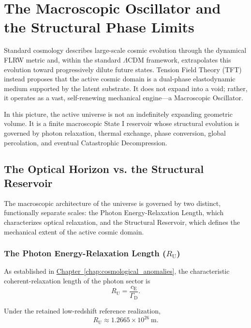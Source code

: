 \chapter{The Macroscopic Oscillator and the Structural Phase Limits}
\label{ch:macroscopic_oscillator}

Standard cosmology describes large-scale cosmic evolution through the dynamical FLRW metric and, within the standard $\Lambda$CDM framework, extrapolates this evolution toward progressively dilute future states. Tension Field Theory (TFT) instead proposes that the active cosmic domain is a dual-phase elastodynamic medium supported by the latent substrate. It does not expand into a void; rather, it operates as a vast, self-renewing mechanical engine—a Macroscopic Oscillator.

In this picture, the active universe is not an indefinitely expanding geometric volume. It is a finite macroscopic State I reservoir whose structural evolution is governed by photon relaxation, thermal exchange, phase conversion, global percolation, and eventual Catastrophic Decompression.

\section{The Optical Horizon vs. the Structural Reservoir}
\label{sec:optical_vs_structural}

The macroscopic architecture of the universe is governed by two distinct, functionally separate scales: the Photon Energy-Relaxation Length, which characterizes optical relaxation, and the Structural Reservoir, which defines the mechanical extent of the active cosmic domain.


\subsection{The Photon Energy-Relaxation Length ($R_{\mathrm U}$)}
\label{subsec:viscous_horizon_macro}

As established in
\hyperref[chap:cosmological_anomalies]{Chapter~\ref*{chap:cosmological_anomalies}},
the characteristic coherent-relaxation length of the photon sector is
\begin{equation}
    R_{\mathrm U}
    =
    \frac{c_{\mathrm E}}{\Gamma_{\mathrm D}}.
\end{equation}

Under the retained low-redshift reference realization,
\begin{equation}
    R_{\mathrm U}
    \approx
    1.2665\times10^{26}\ \mathrm{m}.
\end{equation}

